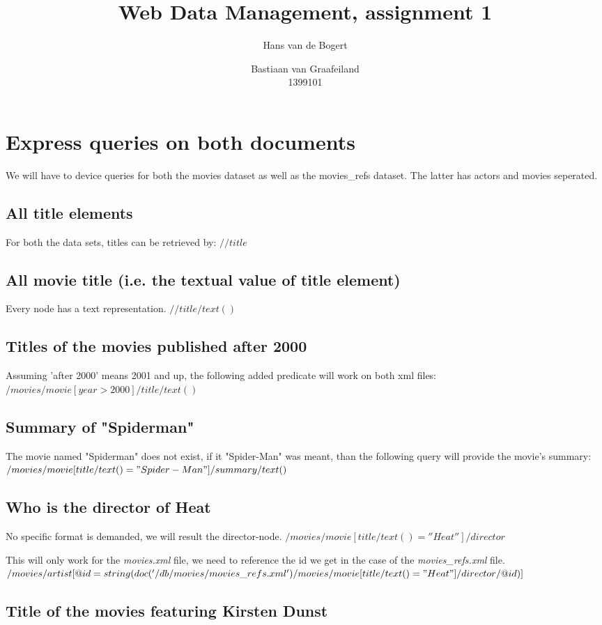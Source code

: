 \documentclass{article}
\title{Web Data Management, assignment 1}
\author{Hans van de Bogert \and Bastiaan van Graafeiland\\1399101}
\begin{document}
\maketitle

\section{Express queries on both documents}
We will have to device queries for both the movies dataset as well as
the movies\_refs dataset. The latter has actors and movies seperated.
\subsection{All title elements}
For both the data sets, titles can be retrieved by:
$//title$
\subsection{All movie title (i.e. the textual value of title element)}
Every node has a text representation.
$//title/text()$
\subsection{Titles of the movies published after 2000}
Assuming 'after 2000' means 2001 and up, the following added predicate
will work on both xml files:
$/movies/movie[year>2000]/title/text()$
\subsection{Summary of "Spiderman"}
The movie named "Spiderman" does not exist, if it "Spider-Man" was
meant, than the following query will provide the movie's summary:
$/movies/movie[title/text()="Spider-Man"]/summary/text()$
\subsection{Who is the director of Heat}
No specific format is demanded, we will result the director-node.
$/movies/movie[title/text()=''Heat'']/director$

This will only work for the \emph{movies.xml} file, we need to
reference the id we get in the case of the \emph{movies\_refs.xml} file.
$/movies/artist[@id=string(doc('/db/movies/movies\_refs.xml')/movies/movie[title/text()="Heat"]/director/@id)]$
\subsection{Title of the movies featuring Kirsten Dunst}
\end{document}
